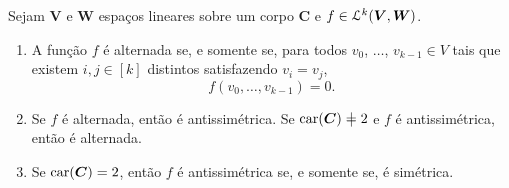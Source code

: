\begin{proposition}
Sejam $\bm V$ e $\bm W$ espaços lineares sobre um corpo $\bm C$ e $f \in \mathcal{L}^k(\bm V,\bm W)$.
	\begin{enumerate}
	\item A função $f$ é alternada se, e somente se, para todos $v_0$, $\ldots$, $v_{k-1} \in V$ tais que existem $i,j \in [k]$ distintos satisfazendo $v_i = v_j$,
	\begin{equation*}
	f(v_0,\ldots,v_{k-1})=0.
	\end{equation*} 
	\item Se $f$ é alternada, então é antissimétrica. Se $\car(\bm C) \neq 2$ e $f$ é antissimétrica, então é alternada.
	\item Se $\operatorname{car}(\bm C) = 2$, então $f$ é antissimétrica se, e somente se, é simétrica.
	\end{enumerate}
\end{proposition}
